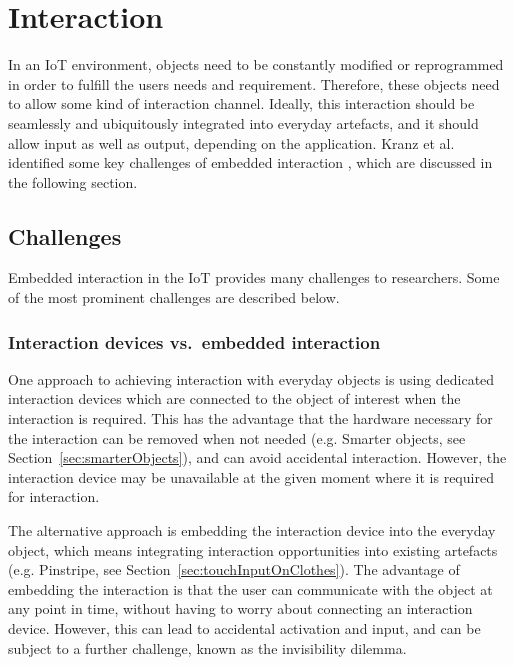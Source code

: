 \section{Interaction}
\label{sec:interaction}
In an IoT environment, objects need to be constantly modified or reprogrammed in order to fulfill the  users needs and requirement. 
Therefore, these objects need to allow some kind of interaction channel. 
Ideally, this interaction should be seamlessly and ubiquitously integrated into everyday artefacts, and it should allow input as well as output, depending on the application. 
Kranz et al. identified some key challenges of embedded interaction \cite{kranz10}, which are discussed in the following section.

\subsection{Challenges}
\label{sec:challenges}
Embedded interaction in the IoT provides many challenges to researchers. Some of the most prominent challenges are described below.

\subsubsection{Interaction devices vs.\ embedded interaction}
One approach to achieving interaction with everyday objects is using dedicated interaction devices which are connected to the object of interest when the interaction is required.
This has the advantage that the hardware necessary for the interaction can be removed when not needed (e.g. Smarter objects, see Section~\ref{sec:smarterObjects}), and can avoid accidental interaction. 
However, the interaction device may be unavailable at the given moment where it is required for interaction.

The alternative approach is embedding the interaction device into the everyday object, which means integrating interaction opportunities into existing artefacts (e.g. Pinstripe, see Section~\ref{sec:touchInputOnClothes}). 
The advantage of embedding the interaction is that the user can communicate with the object at any point in time, without having to worry about connecting an interaction device.
However, this can lead to accidental activation and input, and can be subject to a further challenge, known as the invisibility dilemma.

